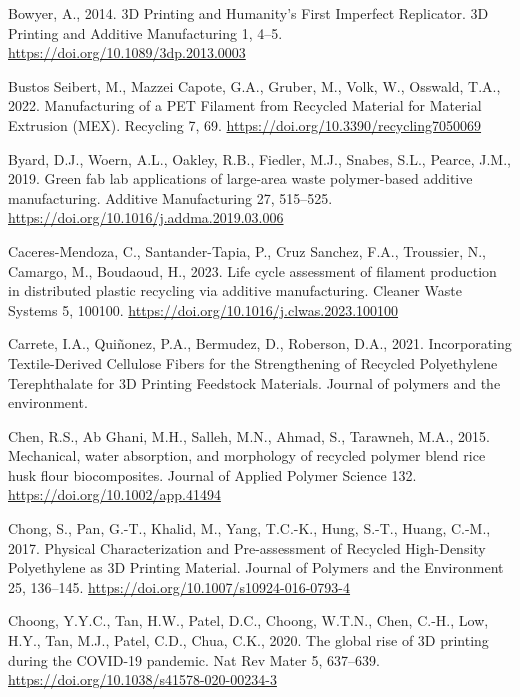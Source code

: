 \documentclass[
  12pt,
]{article}
\newlength{\cslhangindent}
\newlength{\cslentryspacingunit} %
\newenvironment{CSLReferences}[2] %
 {%
  \setlength{\parindent}{0pt}
  \ifodd #1
  \let\oldpar\par
  \def\par{\hangindent=\cslhangindent\oldpar}
  \fi
  \setlength{\parskip}{#2\cslentryspacingunit}
 }%
 {}
\begin{document}
\begin{CSLReferences}{1}{0}
\leavevmode{}%
Bowyer, A., 2014. {3D Printing} and {Humanity}'s {First Imperfect
Replicator}. 3D Printing and Additive Manufacturing 1, 4--5.
\url{https://doi.org/10.1089/3dp.2013.0003}

\leavevmode{}%
Bustos Seibert, M., Mazzei Capote, G.A., Gruber, M., Volk, W., Osswald,
T.A., 2022. Manufacturing of a {PET Filament} from {Recycled Material}
for {Material Extrusion} ({MEX}). Recycling 7, 69.
\url{https://doi.org/10.3390/recycling7050069}

\leavevmode{}%
Byard, D.J., Woern, A.L., Oakley, R.B., Fiedler, M.J., Snabes, S.L.,
Pearce, J.M., 2019. Green fab lab applications of large-area waste
polymer-based additive manufacturing. Additive Manufacturing 27,
515--525. \url{https://doi.org/10.1016/j.addma.2019.03.006}

\leavevmode{}%
Caceres-Mendoza, C., Santander-Tapia, P., Cruz Sanchez, F.A., Troussier,
N., Camargo, M., Boudaoud, H., 2023. Life cycle assessment of filament
production in distributed plastic recycling via additive manufacturing.
Cleaner Waste Systems 5, 100100.
\url{https://doi.org/10.1016/j.clwas.2023.100100}

\leavevmode{}%
Carrete, I.A., Quiñonez, P.A., Bermudez, D., Roberson, D.A., 2021.
Incorporating {Textile-Derived Cellulose Fibers} for the {Strengthening}
of {Recycled Polyethylene Terephthalate} for {3D Printing Feedstock
Materials}. Journal of polymers and the environment.

\leavevmode{}%
Chen, R.S., Ab Ghani, M.H., Salleh, M.N., Ahmad, S., Tarawneh, M.A.,
2015. Mechanical, water absorption, and morphology of recycled polymer
blend rice husk flour biocomposites. Journal of Applied Polymer Science
132. \url{https://doi.org/10.1002/app.41494}

\leavevmode{}%
Chong, S., Pan, G.-T., Khalid, M., Yang, T.C.-K., Hung, S.-T., Huang,
C.-M., 2017. Physical {Characterization} and {Pre-assessment} of
{Recycled High-Density Polyethylene} as {3D Printing Material}. Journal
of Polymers and the Environment 25, 136--145.
\url{https://doi.org/10.1007/s10924-016-0793-4}

\leavevmode{}%
Choong, Y.Y.C., Tan, H.W., Patel, D.C., Choong, W.T.N., Chen, C.-H.,
Low, H.Y., Tan, M.J., Patel, C.D., Chua, C.K., 2020. The global rise of
3D printing during the {COVID}-19 pandemic. Nat Rev Mater 5, 637--639.
\url{https://doi.org/10.1038/s41578-020-00234-3}


\end{CSLReferences}
\end{document}
